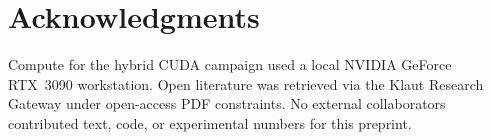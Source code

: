 \section*{Acknowledgments}
\label{sec:acknowledgments}

Compute for the hybrid CUDA campaign used a local NVIDIA GeForce RTX~3090 workstation.
Open literature was retrieved via the Klaut Research Gateway under open-access PDF constraints.
No external collaborators contributed text, code, or experimental numbers for this preprint.
